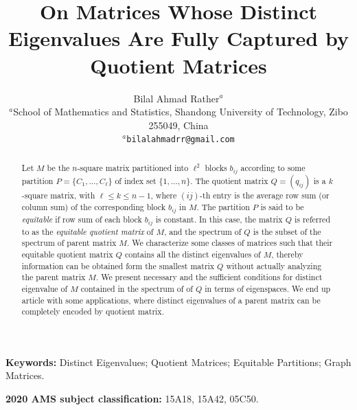 \documentclass[12pt,twoside]{article}
\providecommand{\keywords}[1]
{
	\noindent\textbf{Keywords:} #1
}
\providecommand{\ams}[2]
{
	\noindent\textbf{2020 AMS subject classification:} #2
}
\begin{document}
	\title{On Matrices Whose Distinct Eigenvalues Are Fully Captured by Quotient Matrices}
	\author{
		{ Bilal Ahmad Rather$^{a}$} \\[2mm]
		\small $^{a}$School of Mathematics and Statistics, Shandong University of Technology, Zibo 255049, China\\
		$^{a}$\texttt{bilalahmadrr@gmail.com}
	}
	
	\date{}
	
	\pagestyle{myheadings} 
	\maketitle
	\begin{abstract}
		Let $M$ be the $n$-square matrix partitioned into $\ell^2$ blocks $b_{ij}$ according to some partition $P=\{C_{1},\dots,C_{\ell}\}$ of index set $\{1,\dots,n\}$. The quotient matrix $Q=(q_{ij})$ is a $k$-square matrix, with $\ell \leq k \leq n-1$, where $(ij)$-th entry is the average row sum (or column sum) of the corresponding block $b_{ij}$ in $M$. The partition $P$ is said to be \emph{equitable} if row sum of each block $b_{ij}$ is constant. In this case, the matrix $Q$ is referred to as the \emph{equitable quotient matrix} of $M$, and the spectrum of $Q$ is the subset of the spectrum of parent matrix $M$. We characterize some classes of matrices such that their equitable quotient matrix $Q$ contains all the distinct eigenvalues of $M$, thereby information can be obtained form the smallest matrix $Q$ without actually analyzing the parent matrix $M.$ We present necessary and the sufficient conditions for distinct eigenvalue of $M$ contained in the spectrum of of $Q$ in terms of eigenspaces. We end up article with some applications, where distinct eigenvalues of a parent matrix can be completely encoded by quotient matrix. 
	\end{abstract}
	\vskip 3mm
	
	\keywords{Distinct Eigenvalues; Quotient Matrices; Equitable Partitions; Graph Matrices.}
	
	\ams{}{15A18, 15A42, 05C50.}
\end{document}
